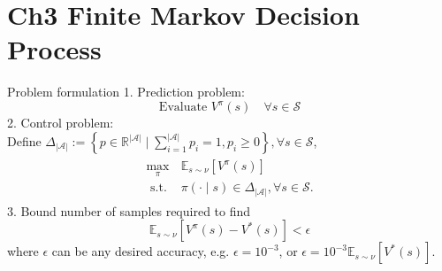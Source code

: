 \documentclass[handout]{beamer}
\begin{document}
\section{Ch3 Finite Markov Decision Process}
\begin{frame}{Problem formulation}
    \small
    1. Prediction problem:
    \begin{equation*}
        \text{Evaluate } V^{\pi}(s) \quad \forall s\in \mathcal{S}
    \end{equation*}
    2. Control problem:\\
    Define $\Delta_{|\mathcal{A}|}:=\left\{p \in \mathbb{R}^{|\mathcal{A}|} \mid \sum_{i=1}^{|\mathcal{A}|} p_{i}=1, p_{i} \geq 0\right\}, \forall s \in \mathcal{S}$,
    \begin{equation*}
        \begin{aligned}
        \begin{array}{ll}
        \max_{\pi} & \mathbb{E}_{s \sim \nu}\left[V^{\pi}(s)\right] \\
        \text { s.t. } & \pi(\cdot \mid s) \in \Delta_{|\mathcal{A}|}, \forall s \in \mathcal{S} .
        \end{array}
        \end{aligned}
    \end{equation*}
    3. Bound number of samples required to find 
    \begin{equation*}
        \mathbb{E}_{s \sim \nu}\left[V^{\pi}(s)-V^*(s)\right] < \epsilon
    \end{equation*}
    where $\epsilon$ can be any desired accuracy, e.g. $\epsilon = 10^{-3}$, or $\epsilon = 10^{-3} \mathbb{E}_{s \sim \nu}\left[V^*(s)\right]$.
\end{frame}
\end{document}
